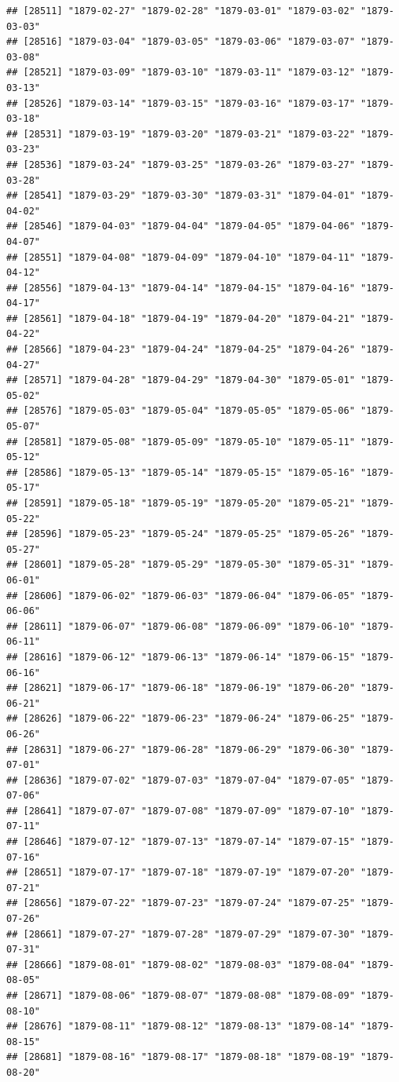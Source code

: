 \documentclass{article}\usepackage[]{graphicx}\usepackage[]{color}
\makeatletter
\newenvironment{kframe}{%
 \def\at@end@of@kframe{}%
 \ifinner\ifhmode%
  \def\at@end@of@kframe{\end{minipage}}%
  \begin{minipage}{\columnwidth}%
 \fi\fi%
 \def\FrameCommand##1{\hskip\@totalleftmargin \hskip-\fboxsep
 \colorbox{shadecolor}{##1}\hskip-\fboxsep
     \hskip-\linewidth \hskip-\@totalleftmargin \hskip\columnwidth}%
 \MakeFramed {\advance\hsize-\width
   \@totalleftmargin\z@ \linewidth\hsize
   \@setminipage}}%
 {\par\unskip\endMakeFramed%
 \at@end@of@kframe}
\newenvironment{knitrout}{}{} %
\makeatother
\begin{document}
\begin{description}
\begin{knitrout}
\begin{kframe}
\begin{verbatim}
## [28511] "1879-02-27" "1879-02-28" "1879-03-01" "1879-03-02" "1879-03-03"
## [28516] "1879-03-04" "1879-03-05" "1879-03-06" "1879-03-07" "1879-03-08"
## [28521] "1879-03-09" "1879-03-10" "1879-03-11" "1879-03-12" "1879-03-13"
## [28526] "1879-03-14" "1879-03-15" "1879-03-16" "1879-03-17" "1879-03-18"
## [28531] "1879-03-19" "1879-03-20" "1879-03-21" "1879-03-22" "1879-03-23"
## [28536] "1879-03-24" "1879-03-25" "1879-03-26" "1879-03-27" "1879-03-28"
## [28541] "1879-03-29" "1879-03-30" "1879-03-31" "1879-04-01" "1879-04-02"
## [28546] "1879-04-03" "1879-04-04" "1879-04-05" "1879-04-06" "1879-04-07"
## [28551] "1879-04-08" "1879-04-09" "1879-04-10" "1879-04-11" "1879-04-12"
## [28556] "1879-04-13" "1879-04-14" "1879-04-15" "1879-04-16" "1879-04-17"
## [28561] "1879-04-18" "1879-04-19" "1879-04-20" "1879-04-21" "1879-04-22"
## [28566] "1879-04-23" "1879-04-24" "1879-04-25" "1879-04-26" "1879-04-27"
## [28571] "1879-04-28" "1879-04-29" "1879-04-30" "1879-05-01" "1879-05-02"
## [28576] "1879-05-03" "1879-05-04" "1879-05-05" "1879-05-06" "1879-05-07"
## [28581] "1879-05-08" "1879-05-09" "1879-05-10" "1879-05-11" "1879-05-12"
## [28586] "1879-05-13" "1879-05-14" "1879-05-15" "1879-05-16" "1879-05-17"
## [28591] "1879-05-18" "1879-05-19" "1879-05-20" "1879-05-21" "1879-05-22"
## [28596] "1879-05-23" "1879-05-24" "1879-05-25" "1879-05-26" "1879-05-27"
## [28601] "1879-05-28" "1879-05-29" "1879-05-30" "1879-05-31" "1879-06-01"
## [28606] "1879-06-02" "1879-06-03" "1879-06-04" "1879-06-05" "1879-06-06"
## [28611] "1879-06-07" "1879-06-08" "1879-06-09" "1879-06-10" "1879-06-11"
## [28616] "1879-06-12" "1879-06-13" "1879-06-14" "1879-06-15" "1879-06-16"
## [28621] "1879-06-17" "1879-06-18" "1879-06-19" "1879-06-20" "1879-06-21"
## [28626] "1879-06-22" "1879-06-23" "1879-06-24" "1879-06-25" "1879-06-26"
## [28631] "1879-06-27" "1879-06-28" "1879-06-29" "1879-06-30" "1879-07-01"
## [28636] "1879-07-02" "1879-07-03" "1879-07-04" "1879-07-05" "1879-07-06"
## [28641] "1879-07-07" "1879-07-08" "1879-07-09" "1879-07-10" "1879-07-11"
## [28646] "1879-07-12" "1879-07-13" "1879-07-14" "1879-07-15" "1879-07-16"
## [28651] "1879-07-17" "1879-07-18" "1879-07-19" "1879-07-20" "1879-07-21"
## [28656] "1879-07-22" "1879-07-23" "1879-07-24" "1879-07-25" "1879-07-26"
## [28661] "1879-07-27" "1879-07-28" "1879-07-29" "1879-07-30" "1879-07-31"
## [28666] "1879-08-01" "1879-08-02" "1879-08-03" "1879-08-04" "1879-08-05"
## [28671] "1879-08-06" "1879-08-07" "1879-08-08" "1879-08-09" "1879-08-10"
## [28676] "1879-08-11" "1879-08-12" "1879-08-13" "1879-08-14" "1879-08-15"
## [28681] "1879-08-16" "1879-08-17" "1879-08-18" "1879-08-19" "1879-08-20"

\end{verbatim}
\end{kframe}
\end{knitrout}
\end{description}
\end{document}
